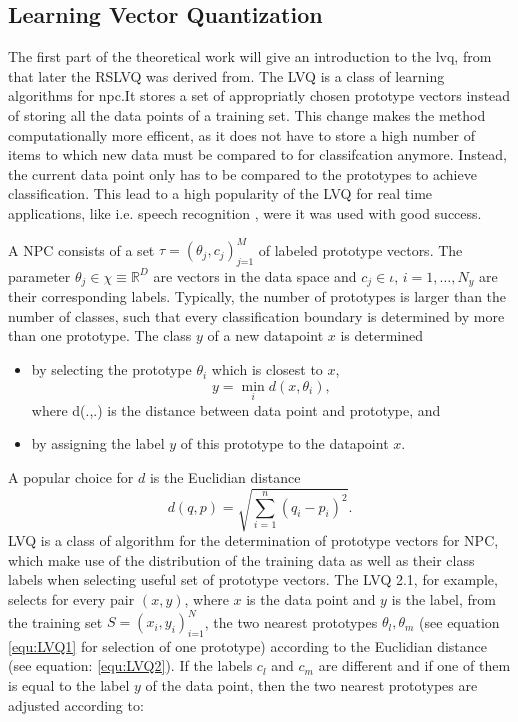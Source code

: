 \documentclass[12pt,oneside,a4paper,parskip]{scrbook}
\newcommand{\R}{\mathbb{R}}
\begin{document}
\subsection{Learning Vector Quantization}
The first part of the theoretical work will give an introduction to the \ac{lvq}, from that later 
the RSLVQ was derived from.
The LVQ is a class of learning algorithms for \ac{npc}.It stores a set of appropriatly chosen
prototype vectors instead of storing all the data points of a training set. This change makes the method computationally more
efficent, as it does not have to store a high number of items to which new data must be compared to for classifcation anymore.
Instead, the current data point only has to be compared to the prototypes to achieve classification.
This lead to a high popularity of the LVQ for real time applications, like i.e. speech recognition \cite{lvqEx1,lvqEx2}, 
were it was used with good success.

A NPC consists of a set $\tau = (\theta_j, c_j)^M_\textit{j=1}$ of labeled prototype vectors. The parameter $\theta_j \in \chi \equiv \R^D$
are vectors in the data space and $c_j \in \iota$, $i = 1,\dots,N_y$ are their corresponding labels. Typically, 
the number of prototypes is larger than the number of classes, such that every classification boundary is determined by 
more than one prototype.
The class $y$ of a new datapoint $x$ is determined 

\begin{itemize}
  \item by selecting the prototype $\theta_i$ which is closest to $x$,
  \begin{equation}
    y = \displaystyle\min_{i} d(x,\theta_i),
    \label{equ:LVQ1}
  \end{equation}
  where d(.,.) is the distance between data point and prototype, and
  \item by assigning the label $y$ of this prototype to the datapoint $x$.
\end{itemize}

A popular choice for $d$ is the Euclidian distance 
\begin{equation}
  d(q,p) = \sqrt{\displaystyle\sum^n_\textit{i = 1}(q_i-p_i)^2}.
  \label{equ:LVQ2}
\end{equation}
LVQ is a class of algorithm for the determination of prototype vectors for NPC, which make use of the distribution of the
training data as well as their class labels when selecting useful set of prototype vectors. 
The LVQ 2.1, for example, selects for every pair $(x,y)$, where $x$ is the data point and $y$ is the label, from
the training set $S = (x_i,y_i)^N_\textit{i=1}$, the two nearest prototypes $\theta_l,\theta_m$ (see equation \ref{equ:LVQ1} 
for selection of one prototype) according to the Euclidian distance (see equation: \ref{equ:LVQ2}).
If the labels $c_l$ and $c_m$ are different and if one of them is equal to the label $y$ of the data point, then the two nearest
prototypes are adjusted according to:
\end{document}
